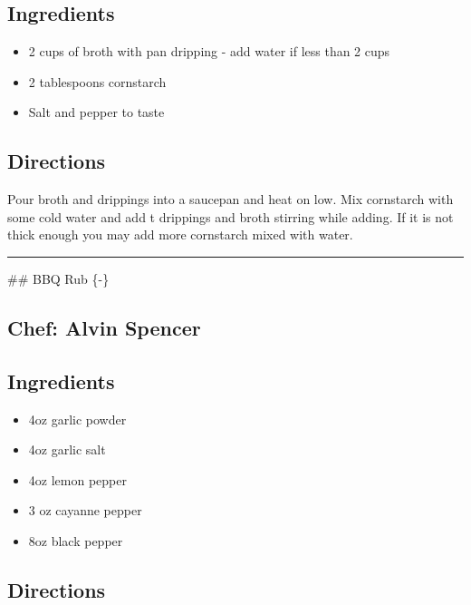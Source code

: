 \documentclass[
]{book}
\providecommand{\tightlist}{%
  \setlength{\itemsep}{0pt}\setlength{\parskip}{0pt}}
\begin{document}
\hypertarget{ingredients-113}{%
\subsection*{Ingredients}\label{ingredients-113}}


\begin{itemize}
\tightlist
\item
  2 cups of broth with pan dripping - add water if less than 2 cups
\item
  2 tablespoons cornstarch
\item
  Salt and pepper to taste
\end{itemize}

\hypertarget{directions-113}{%
\subsection*{Directions}\label{directions-113}}


Pour broth and drippings into a saucepan and heat on low. Mix cornstarch with some cold water and add t drippings and broth stirring while adding. If it is not thick enough you may add more cornstarch mixed with water.

\begin{center}\rule{0.5\linewidth}{0.5pt}\end{center}

\#\# BBQ Rub \{-\}

\hypertarget{chef-alvin-spencer-1}{%
\subsection*{Chef: Alvin Spencer}\label{chef-alvin-spencer-1}}


\hypertarget{ingredients-114}{%
\subsection*{Ingredients}\label{ingredients-114}}


\begin{itemize}
\tightlist
\item
  4oz garlic powder
\item
  4oz garlic salt
\item
  4oz lemon pepper
\item
  3 oz cayanne pepper
\item
  8oz black pepper
\end{itemize}

\hypertarget{directions-114}{%
\subsection*{Directions}\label{directions-114}}
\end{document}
